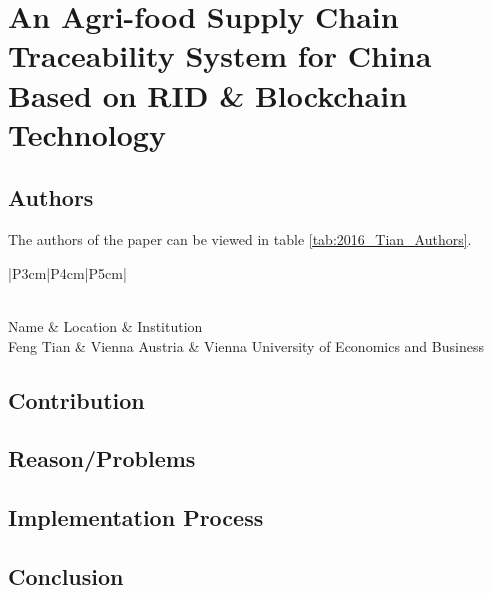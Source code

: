 \clearpage
\section*{\centering An Agri-food Supply Chain Traceability System for China Based on RID \& Blockchain Technology}

\subsection*{Authors}
The authors of the paper \cite{2016_Tian} can be viewed in table \ref{tab:2016_Tian_Authors}.
\begin{longtable}{ |P{3cm}|P{4cm}|P{5cm}| }
	\caption{Authors} \label{tab:2016_Tian_Authors} \\
	\hline
 	Name & Location & Institution \\ [0.5ex] 
 	\hline\hline
 	\endhead
 	Feng Tian & Vienna Austria  & Vienna University of Economics and Business \\
	 \hline
\end{longtable}


\subsection*{Contribution}



\subsection*{Reason/Problems}



\subsection*{Implementation Process}


\subsection*{Conclusion}

